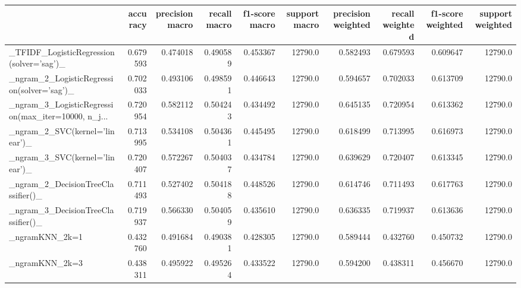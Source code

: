 \begin{tabular}{lrrrrrrrrr}
\toprule
{} &  accuracy &  precision macro &  recall macro &  f1-score macro &  support macro &  precision weighted &  recall weighted &  f1-score weighted &  support weighted \\
\midrule
\_TFIDF\_LogisticRegression(solver='sag')\_           &  0.679593 &         0.474018 &      0.490589 &        0.453367 &        12790.0 &            0.582493 &         0.679593 &           0.609647 &           12790.0 \\
\_ngram\_2\_LogisticRegression(solver='sag')\_         &  0.702033 &         0.493106 &      0.498591 &        0.446643 &        12790.0 &            0.594657 &         0.702033 &           0.613709 &           12790.0 \\
\_ngram\_3\_LogisticRegression(max\_iter=10000, n\_j... &  0.720954 &         0.582112 &      0.504243 &        0.434492 &        12790.0 &            0.645135 &         0.720954 &           0.613362 &           12790.0 \\
\_ngram\_2\_SVC(kernel='linear')\_                     &  0.713995 &         0.534108 &      0.504361 &        0.445495 &        12790.0 &            0.618499 &         0.713995 &           0.616973 &           12790.0 \\
\_ngram\_3\_SVC(kernel='linear')\_                     &  0.720407 &         0.572267 &      0.504037 &        0.434784 &        12790.0 &            0.639629 &         0.720407 &           0.613345 &           12790.0 \\
\_ngram\_2\_DecisionTreeClassifier()\_                 &  0.711493 &         0.527402 &      0.504188 &        0.448526 &        12790.0 &            0.614746 &         0.711493 &           0.617763 &           12790.0 \\
\_ngram\_3\_DecisionTreeClassifier()\_                 &  0.719937 &         0.566330 &      0.504059 &        0.435610 &        12790.0 &            0.636335 &         0.719937 &           0.613636 &           12790.0 \\
\_ngramKNN\_2k=1                                     &  0.432760 &         0.491684 &      0.490381 &        0.428305 &        12790.0 &            0.589444 &         0.432760 &           0.450732 &           12790.0 \\
\_ngramKNN\_2k=3                                     &  0.438311 &         0.495922 &      0.495264 &        0.433522 &        12790.0 &            0.594200 &         0.438311 &           0.456670 &           12790.0 \\

\end{tabular}
